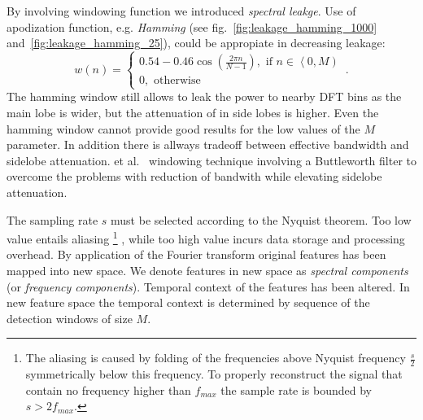 By involving windowing function we introduced
\emph{spectral leakge}. Use of apodization function, e.g. \emph{Hamming} %
(see fig.~\ref{fig:leakage_hamming_1000} and~\ref{fig:leakage_hamming_25}),
could be appropiate in decreasing leakage:
\begin{equation}\label{eq:hamm}
w(n) = \left\lbrace \begin{array}{l} 
0.54 - 0.46\cos \left ( \frac{2\pi n}{N-1} \right), \mbox{ if } n\in \left\langle 0, M \right) \\
 0, \mbox{ otherwise} \end{array}\right. \,.
\end{equation}
The hamming window still allows to leak the power to nearby DFT bins as the
main lobe is wider, but the attenuation of in side lobes is higher.
Even the hamming window cannot provide good results for the low values of the $M$ 
parameter. In addition there is allways tradeoff between effective bandwidth and
sidelobe attenuation.  et al.~\cite{yoon2009butterworth} windowing technique 
involving a Buttleworth filter to overcome the problems with reduction of bandwith 
while elevating sidelobe attenuation.

The sampling rate $s$ must be selected according to the Nyquist theorem. 
Too low value entails aliasing%
\footnote{
    The aliasing is caused by folding of the frequencies above Nyquist frequency
    $\frac{s}{2}$ symmetrically below this frequency. 
    To properly reconstruct the signal that contain no frequency higher than $f_{max}$ 
    the sample rate is bounded by $s > 2f_{max}$.
}%
, while too high value incurs data storage and processing overhead. 
By application of the Fourier transform original features has been mapped into new space.
We denote features in new space as \emph{spectral components} (or \emph{frequency components}).
Temporal context of the features has been altered. 
In new feature space the temporal context is determined by sequence
of the detection windows of size $M$. 

